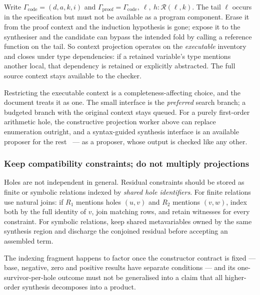 Write $\Gamma_{\mathrm{code}}=(d,a,k,i)$ and
$\Gamma_{\mathrm{proof}}=\Gamma_{\mathrm{code}},\ \ell,\ h:\mathcal R(\ell,k)$.
The tail $\ell$ occurs in the specification but must not be available as a
program component. Erase it from the proof context and the induction hypothesis
is gone; expose it to the synthesiser and the candidate can bypass the intended
fold by calling a reference function on the tail. So context projection operates
on the \emph{executable} inventory and closes under type dependencies: if a
retained variable's type mentions another local, that dependency is retained or
explicitly abstracted. The full source context stays available to the checker.

Restricting the executable context is a completeness-affecting choice, and the
document treats it as one. The small interface is the \emph{preferred} search
branch; a budgeted branch with the original context stays queued. For a purely
first-order arithmetic hole, the constructive projection worker above can
replace enumeration outright, and a syntax-guided synthesis interface is an
available proposer for the rest~\cite{cvc5-sygus} --- as a proposer, whose
output is checked like any other.

\subsubsection*{Keep compatibility constraints; do not multiply projections}

Holes are not independent in general. Residual constraints should be stored as
finite or symbolic relations indexed by \emph{shared hole identifiers}. For
finite relations use natural joins: if $R_1$ mentions holes $(u,v)$ and $R_2$
mentions $(v,w)$, index both by the full identity of $v$, join matching rows,
and retain witnesses for every constraint. For symbolic relations, keep shared
metavariables owned by the same synthesis region and discharge the conjoined
residual before accepting an assembled term.

The indexing fragment happens to factor once the constructor contract is fixed
--- base, negative, zero and positive results have separate conditions --- and
its one-survivor-per-hole outcome must not be generalised into a claim that all
higher-order synthesis decomposes into a product.

